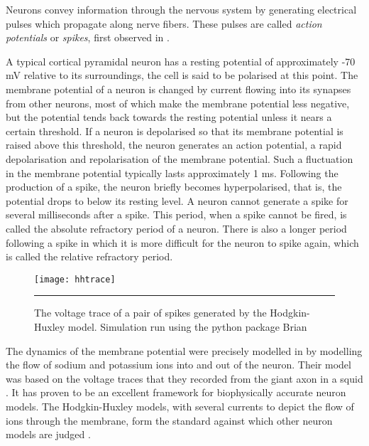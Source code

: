 Neurons convey information through the nervous system by generating
electrical pulses which propagate along nerve fibers.  These pulses are
called \emph{action potentials} or \emph{spikes}, first observed in \citep{DuBoisReymond1884a}.  

A typical cortical pyramidal neuron has a resting potential of approximately -70 mV relative to
its surroundings, the cell is said to be polarised at this point.
The membrane potential of a neuron is changed by current
flowing into its synapses from other neurons, most of which make the membrane potential less negative, but the potential tends back towards the resting potential
unless it nears a certain threshold. If a neuron
is depolarised so that its membrane potential is raised above this
threshold, the neuron generates an action potential, a rapid depolarisation and repolarisation of the membrane potential.  Such a fluctuation in the membrane potential typically lasts 
approximately 1 ms. Following the production of a spike, the neuron briefly 
becomes hyperpolarised, that is, the potential drops to below its resting level. A neuron cannot generate a spike for several milliseconds after a spike. This period, when a spike cannot be fired, is
called the absolute refractory period of a neuron.  There is also a longer period following a spike in which
it is more difficult for the neuron to spike again, which is called
the relative refractory period. 

\begin{figure}[htb]
\texttt{[image: hhtrace]}
\bigskip
\rule{31.5em}{0.5pt}
\caption{The voltage trace of a pair of spikes generated by the Hodgkin-Huxley model.  Simulation run using the python package Brian \citep{GoodmanBrette2008a}}
\end{figure}

The dynamics of the membrane potential were precisely modelled in \citep{HodgkinHuxley1952a} by modelling the flow of sodium and potassium ions into and out of the neuron.  Their model was based on the voltage traces that they recorded from the giant axon in a squid \citep{HodgkinHuxley1939a}. It has proven to be an excellent framework for biophysically accurate neuron models. The Hodgkin-Huxley models, with several currents to depict the flow of ions through the membrane, form the standard against which other neuron models are judged \citep{Izhikevich2004a}.

